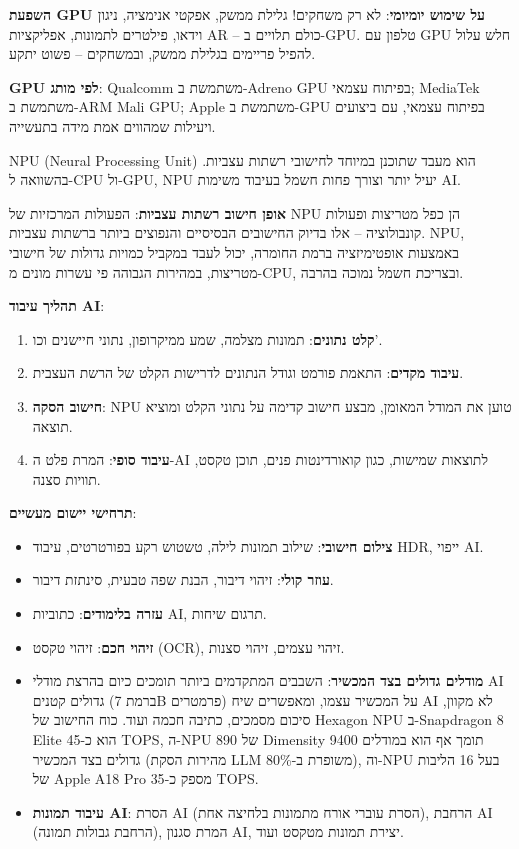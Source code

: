 \textbf{השפעת GPU על שימוש יומיומי}: לא רק משחקים! גלילת ממשק, אפקטי אנימציה, ניגון וידאו, פילטרים לתמונות, אפליקציות AR – כולם תלויים ב-GPU. טלפון עם GPU חלש עלול להפיל פריימים בגלילת ממשק, ובמשחקים – פשוט יתקע.

\textbf{GPU לפי מותג}: Qualcomm משתמשת ב-Adreno GPU בפיתוח עצמאי; MediaTek משתמשת ב-ARM Mali GPU; Apple משתמשת ב-GPU בפיתוח עצמאי, עם ביצועים ויעילות שמהווים אמת מידה בתעשייה.


NPU (Neural Processing Unit) הוא מעבד שתוכנן במיוחד לחישובי רשתות עצביות. בהשוואה ל-CPU ול-GPU, NPU יעיל יותר וצורך פחות חשמל בעיבוד משימות AI.

\textbf{אופן חישוב רשתות עצביות}: הפעולות המרכזיות של NPU הן כפל מטריצות ופעולות קונבולוציה – אלו בדיוק החישובים הבסיסיים והנפוצים ביותר ברשתות עצביות. NPU, באמצעות אופטימיזציה ברמת החומרה, יכול לעבד במקביל כמויות גדולות של חישובי מטריצות, במהירות הגבוהה פי עשרות מונים מ-CPU, ובצריכת חשמל נמוכה בהרבה.

\textbf{תהליך עיבוד AI}:

\begin{enumerate}
  \item \textbf{קלט נתונים}: תמונות מצלמה, שמע ממיקרופון, נתוני חיישנים וכו'.
  \item \textbf{עיבוד מקדים}: התאמת פורמט וגודל הנתונים לדרישות הקלט של הרשת העצבית.
  \item \textbf{חישוב הסקה}: NPU טוען את המודל המאומן, מבצע חישוב קדימה על נתוני הקלט ומוציא תוצאה.
  \item \textbf{עיבוד סופי}: המרת פלט ה-AI לתוצאות שמישות, כגון קואורדינטות פנים, תוכן טקסט, תוויות סצנה.
\end{enumerate}

\textbf{תרחישי יישום מעשיים}:

\begin{itemize}
  \item \textbf{צילום חישובי}: שילוב תמונות לילה, טשטוש רקע בפורטרטים, עיבוד HDR, ייפוי AI.
  \item \textbf{עוזר קולי}: זיהוי דיבור, הבנת שפה טבעית, סינתזת דיבור.
  \item \textbf{עזרה בלימודים}: כתוביות AI, תרגום שיחות.
  \item \textbf{זיהוי חכם}: זיהוי טקסט (OCR), זיהוי עצמים, זיהוי סצנות.
  \item \textbf{מודלים גדולים בצד המכשיר}: השבבים המתקדמים ביותר תומכים כיום בהרצת מודלי AI גדולים קטנים (ברמת 7B פרמטרים) על המכשיר עצמו, ומאפשרים שיח AI לא מקוון, סיכום מסמכים, כתיבה חכמה ועוד. כוח החישוב של Hexagon NPU ב-Snapdragon 8 Elite הוא כ-45 TOPS, ה-NPU 890 של Dimensity 9400 תומך אף הוא במודלים גדולים בצד המכשיר (מהירות הסקת LLM משופרת ב-80\%), וה-NPU בעל 16 הליבות של Apple A18 Pro מספק כ-35 TOPS.
  \item \textbf{עיבוד תמונות AI}: הסרת AI (הסרת עוברי אורח מתמונות בלחיצה אחת), הרחבת AI (הרחבת גבולות תמונה), המרת סגנון AI, יצירת תמונות מטקסט ועוד.
\end{itemize}

